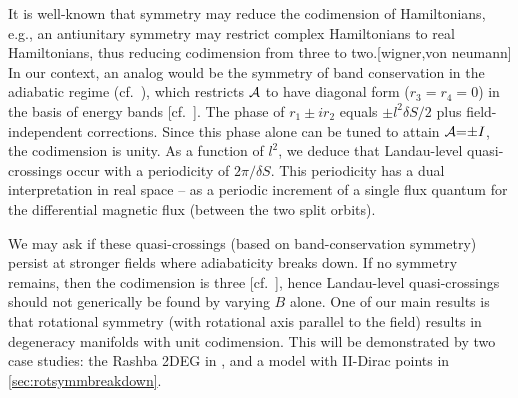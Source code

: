 \documentclass[aps, prb, showpacs, twocolumn, notitlepage, superscriptaddress]{revtex4-1}
\begin{document}
It is well-known that symmetry may reduce the codimension of Hamiltonians, e.g., an antiunitary symmetry may restrict complex Hamiltonians to real Hamiltonians, thus reducing codimension from three to two.[wigner,von neumann] In our context, an analog would be the symmetry of band conservation in the adiabatic regime (cf.\ ), which restricts ${\cal A}$ to have diagonal form  ($r_3{=}r_4{=}0$) in the basis of energy bands [cf.\ ]. The phase of $r_1{\pm}ir_2$ equals ${\pm} l^2\delta S/2$ plus field-independent corrections. Since this  phase alone  can be  tuned to attain ${\cal A}{=}{\pm}I$, the codimension is unity. As a function of $l^2$, we deduce that Landau-level quasi-crossings occur  with a periodicity of $2\pi/\delta S$. This periodicity  has a dual interpretation  in real space -- as a periodic increment of a single flux quantum for  the differential magnetic flux (between the two split orbits).


We may ask if these quasi-crossings (based on band-conservation symmetry) persist at stronger fields where adiabaticity breaks down. If no symmetry remains, then the codimension is three [cf.\ ], hence Landau-level quasi-crossings should not generically be found by varying $B$ alone. One of our main results is that  rotational symmetry (with rotational axis parallel to the field) results in degeneracy manifolds with unit codimension. This will be demonstrated by two  case studies: the Rashba 2DEG in , and a model with II-Dirac points in \ref{sec:rotsymmbreakdown}. 









\end{document}
